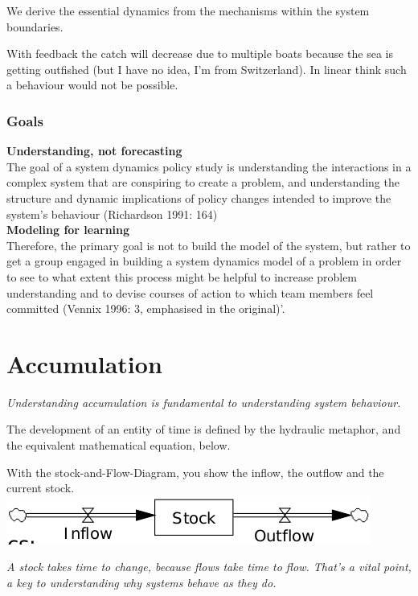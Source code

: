 We derive the essential dynamics from the mechanisms within the system
boundaries.

With feedback the catch will decrease due to multiple boats because the
sea is getting outfished (but I have no idea, I'm from Switzerland). In
linear think such a behaviour would not be possible.

\hypertarget{goals}{%
\subsubsection{Goals}\label{goals}}

\textbf{Understanding, not forecasting}\\
The goal of a system dynamics policy study is understanding the
interactions in a complex system that are conspiring to create a
problem, and understanding the structure and dynamic implications of
policy changes intended to improve the system's behaviour (Richardson
1991: 164)\\
\textbf{Modeling for learning}\\
Therefore, the primary goal is not to build the model of the system, but
rather to get a group engaged in building a system dynamics model of a
problem in order to see to what extent this process might be helpful to
increase problem understanding and to devise courses of action to which
team members feel committed (Vennix 1996: 3, emphasised in the
original)'.

\hypertarget{accumulation}{%
\section{Accumulation}\label{accumulation}}

\emph{Understanding accumulation is fundamental to understanding system
behaviour.}

The development of an entity of time is defined by the hydraulic
metaphor, and the equivalent mathematical equation, below.

With the stock-and-Flow-Diagram, you show the inflow, the outflow and
the current stock. \includegraphics{figures/stocknflow.png}

\emph{A stock takes time to change, because flows take time to flow.
That's a vital point, a key to understanding why systems behave as they
do.}

